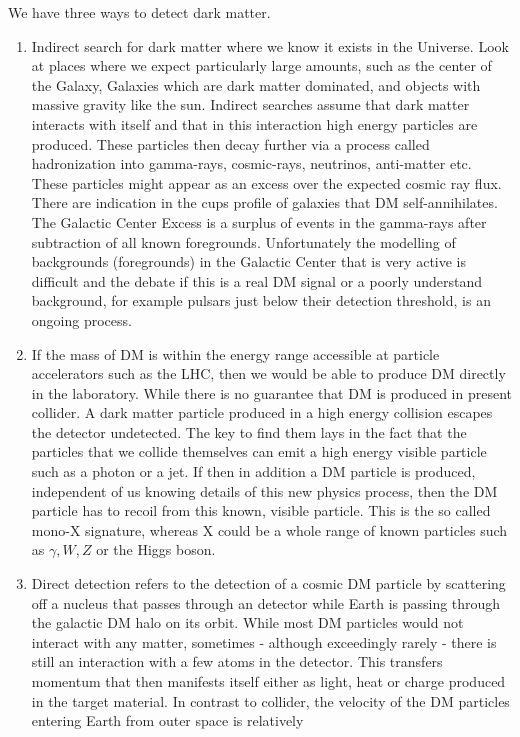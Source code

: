 \documentclass[11pt]{article}
\theoremstyle{break}
\theoremstyle{break}
\begin{document}
We have three ways to detect dark matter. 
\begin{enumerate}
\item Indirect search for dark matter where we know it exists in the Universe. Look at places where we expect particularly large amounts, such as the center of the Galaxy, Galaxies which are dark matter dominated, and objects with massive gravity like the sun. Indirect searches assume that dark matter interacts with itself and that in this interaction high energy particles are produced. These particles then decay
further via a process called hadronization into gamma-rays, cosmic-rays, neutrinos, anti-matter etc. These particles might appear as an excess over the expected cosmic ray flux. There are indication in the cups profile of galaxies that DM self-annihilates. The Galactic Center Excess is a surplus of events
in the gamma-rays after subtraction of all known foregrounds. Unfortunately the modelling of
backgrounds (foregrounds) in the Galactic Center that is very active is difficult and the debate
if this is a real DM signal or a poorly understand background, for example pulsars just below
their detection threshold, is an ongoing process.
\item If the mass of DM is within the energy range accessible at particle accelerators such as the LHC,
then we would be able to produce DM directly in the laboratory. While there is no guarantee that
DM is produced in present collider. A dark matter particle produced in a high energy
collision escapes the detector undetected. The key to find them lays in the fact that the particles that we collide themselves can emit a high energy visible particle such as a photon or a jet. If then in addition a DM particle is produced, independent of us knowing details of this new physics process, then the DM particle has to recoil from this known, visible particle. This is the so called mono-X signature, whereas X could be a whole range of known particles such as $\gamma,W,Z$ or the Higgs boson.
\item Direct detection refers to the detection of a cosmic DM particle by scattering off a nucleus that
passes through an detector while Earth is passing through the galactic DM halo on its orbit.
While most DM particles would not interact with any matter, sometimes - although exceedingly
rarely - there is still an interaction with a few atoms in the detector. This transfers momentum
that then manifests itself either as light, heat or charge produced in the target material. In
contrast to collider, the velocity of the DM particles entering Earth from outer space is relatively

\end{enumerate}
\end{document}
